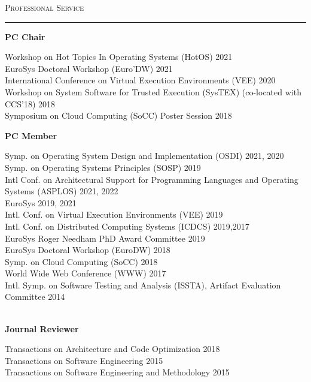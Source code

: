 \documentclass[10pt]{article}
\newcommand{\mysec}[1]{\vspace{2em}\textsc{\large #1}\vspace{1mm}\hrule\vspace{2mm}}
\newcommand{\mysub}[3]{\textbf{#1} {#2} \hfill {\em #3}}
\newcommand{\myssub}[1]{\hspace*{2mm}\parbox{163mm}{#1}\vspace*{2mm}}
\begin{document}
\mysec{Professional Service}


\mysub{PC Chair}{}{}\\
\myssub{\vspace{2mm}
  Workshop on Hot Topics In Operating Systems (HotOS) \hfill 2021 \\
  EuroSys Doctoral Workshop (Euro'DW) \hfill 2021 \\
  International Conference on Virtual Execution Environments (VEE) \hfill 2020 \\
  Workshop on System Software for Trusted Execution (SysTEX) (co-located with CCS'18) \hfill 2018 \\
  Symposium on Cloud Computing (SoCC) Poster Session \hfill 2018 \\
}
%

\newpage

\mysub{PC Member}{}{}\\
\myssub{\vspace{2mm}
  Symp. on Operating System Design and Implementation (OSDI) \hfill 2021, 2020 \\
  Symp. on Operating Systems Principles (SOSP) \hfill 2019 \\
  Intl Conf. on Architectural Support for Programming Languages and Operating Systems (ASPLOS) \hfill 2021, 2022 \\
  EuroSys \hfill 2019, 2021 \\
  Intl. Conf. on Virtual Execution Environments (VEE) \hfill 2019 \\
  Intl. Conf. on Distributed Computing Systems (ICDCS) \hfill 2019,2017 \\
  EuroSys Roger Needham PhD Award Committee \hfill 2019 \\  
  EuroSys Doctoral Workshop (EuroDW) \hfill 2018 \\
  Symp. on Cloud Computing (SoCC) \hfill 2018 \\
  World Wide Web Conference (WWW) \hfill 2017 \\
  Intl. Symp. on Software Testing and Analysis (ISSTA), Artifact Evaluation Committee \hfill 2014 \\
}\\

\mysub{Journal Reviewer}{}{} \\
\myssub{\vspace{2mm}Transactions on Architecture and Code Optimization \hfill 2018\\
  Transactions on Software Engineering \hfill 2015 \\
  Transactions on Software Engineering and Methodology \hfill 2015} \\
\end{document}
